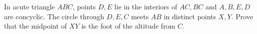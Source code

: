 In acute triangle $ABC$, points $D,E$ lie in the interiors of $AC,BC$ and $A,B,E,D$ are concyclic. The circle through $D,E,C$ meets $AB$ in distinct points $X,Y$. Prove that the midpoint of $XY$ is the foot of the altitude from $C$.
